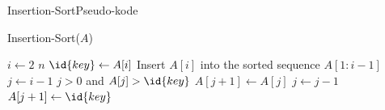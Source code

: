 \documentclass{beamer}
\begin{document}
\begin{frame}{Insertion-Sort}{Pseudo-kode}
    \centering
    \begin{minipage}{.8\textwidth}
        \begin{block}{Insertion-Sort($A$)}

        \vspace{-\abovedisplayskip}
            \begin{codebox}
                \li \For $i \gets 2$ \To $n$ \Do
                    \li $\id{key} \gets A[i]$
                    \li \Comment Insert $A[i]$ into the sorted sequence $A[1:i-1]$
                    \li $j \gets i - 1$
                    \li \While $j > 0$ and $A[j] > \id{key}$ \Do
                        \li $A[j+1] \gets A[j]$
                        \li $j \gets j - 1$
                    \End
                    \li $A[j+1] \gets \id{key}$
                \End
            \end{codebox}
        \end{block}
    \end{minipage}
    
\end{frame}
\end{document}
